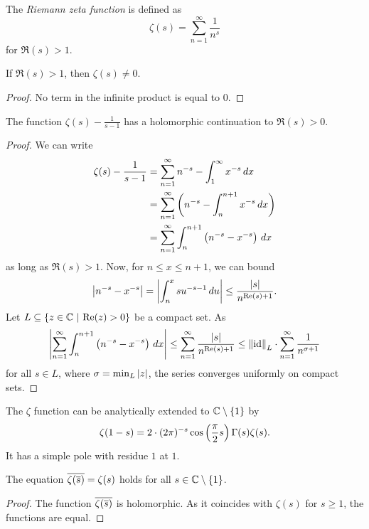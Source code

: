 \begin{definicija}
The \emph{Riemann zeta function} is
defined as
\[
\zeta(s) = \sum_{n=1}^\infty \frac{1}{n^s}
\]
for $\Re(s) > 1$.
\end{definicija}

\begin{lema}
If $\Re(s) > 1$, then $\zeta(s) \ne 0$.
\end{lema}

\begin{proof}
No term in the infinite product is equal to $0$.
\end{proof}

\begin{trditev}
The function $\zeta(s) - \frac{1}{s-1}$ has a holomorphic
continuation to $\Re(s) > 0$.
\end{trditev}

\begin{proof}
We can write
\begin{align*}
\zeta(s) - \frac{1}{s-1} &=
\sum_{n=1}^\infty n^{-s} - \int_1^\infty x^{-s}\,dx
\\
&=
\sum_{n=1}^\infty \left(n^{-s} - \int_n^{n+1} x^{-s}\,dx\right)
\\
&=
\sum_{n=1}^\infty \int_n^{n+1} \left(n^{-s} - x^{-s}\right)\,dx
\end{align*}
as long as $\Re(s) > 1$. Now, for $n \leq x \leq n+1$, we can bound
\[
\left\lvert n^{-s} - x^{-s}\right\rvert =
\left\lvert \int_n^x s u^{-s-1}\,du\right\rvert \leq
\frac{\left\lvert s\right\rvert}{n^{\operatorname{Re}(s)+1}}.
\]
Let $L \subseteq \left\{z \in \mathbb{C}~\middle\vert~\operatorname{Re}(z) > 0\right\}$ be a compact set. As
\[
\left\lvert \sum_{n=1}^\infty \int_n^{n+1} \left(n^{-s} - x^{-s}\right)\,dx\right\rvert \leq
\sum_{n=1}^\infty \frac{\left\lvert s\right\rvert}{n^{\operatorname{Re}(s)+1}} \leq
\left\lVert \operatorname{id}\right\rVert_L \cdot \sum_{n=1}^\infty \frac{1}{n^{\sigma+1}}
\]
for all $s \in L$, where $\sigma = \min_L \left\lvert z\right\rvert$, the series
converges uniformly on compact sets.
\end{proof}

\begin{opomba}
The $\zeta$ function can be analytically extended to
$\mathbb{C} \setminus \left\{1\right\}$ by
\[
\zeta(1-s) =
2 \cdot (2 \pi)^{-s} \cos \left(\frac{\pi}{2} s\right) \Gamma(s) \zeta(s).
\]
It has a simple pole with residue $1$ at $1$.
\end{opomba}

\begin{lema}
The equation $\overline{\zeta(\overline{s})} = \zeta(s)$ holds for all
$s \in \mathbb{C} \setminus \left\{1\right\}$.
\end{lema}

\begin{proof}
The function $\overline{\zeta(\overline{s})}$ is holomorphic. As it
coincides with $\zeta(s)$ for $s \geq 1$, the functions are equal.
\end{proof}

